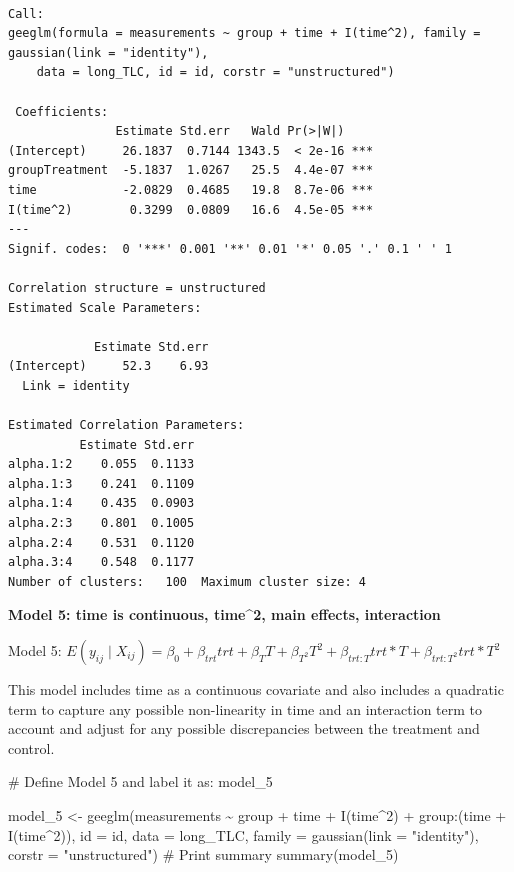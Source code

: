 \documentclass[
  letterpaper,
  DIV=11,
  numbers=noendperiod]{scrreprt}
\newenvironment{Shaded}{\begin{snugshade}}{\end{snugshade}}
\newcommand{\AttributeTok}[1]{\textcolor[rgb]{0.40,0.45,0.13}{#1}}
\newcommand{\CommentTok}[1]{\textcolor[rgb]{0.37,0.37,0.37}{#1}}
\newcommand{\DecValTok}[1]{\textcolor[rgb]{0.68,0.00,0.00}{#1}}
\newcommand{\FunctionTok}[1]{\textcolor[rgb]{0.28,0.35,0.67}{#1}}
\newcommand{\NormalTok}[1]{\textcolor[rgb]{0.00,0.23,0.31}{#1}}
\newcommand{\OtherTok}[1]{\textcolor[rgb]{0.00,0.23,0.31}{#1}}
\newcommand{\SpecialCharTok}[1]{\textcolor[rgb]{0.37,0.37,0.37}{#1}}
\newcommand{\StringTok}[1]{\textcolor[rgb]{0.13,0.47,0.30}{#1}}
\begin{document}
\begin{verbatim}

Call:
geeglm(formula = measurements ~ group + time + I(time^2), family = gaussian(link = "identity"), 
    data = long_TLC, id = id, corstr = "unstructured")

 Coefficients:
               Estimate Std.err   Wald Pr(>|W|)    
(Intercept)     26.1837  0.7144 1343.5  < 2e-16 ***
groupTreatment  -5.1837  1.0267   25.5  4.4e-07 ***
time            -2.0829  0.4685   19.8  8.7e-06 ***
I(time^2)        0.3299  0.0809   16.6  4.5e-05 ***
---
Signif. codes:  0 '***' 0.001 '**' 0.01 '*' 0.05 '.' 0.1 ' ' 1

Correlation structure = unstructured 
Estimated Scale Parameters:

            Estimate Std.err
(Intercept)     52.3    6.93
  Link = identity 

Estimated Correlation Parameters:
          Estimate Std.err
alpha.1:2    0.055  0.1133
alpha.1:3    0.241  0.1109
alpha.1:4    0.435  0.0903
alpha.2:3    0.801  0.1005
alpha.2:4    0.531  0.1120
alpha.3:4    0.548  0.1177
Number of clusters:   100  Maximum cluster size: 4 
\end{verbatim}

\textbf{Model 5: time is continuous, time\^{}2, main effects,
interaction}

Model 5:
\(E(y_{ij} \mid X_{ij}) = \beta_0 + \beta_{trt}trt + \beta_{T}T + \beta_{T^2}T^2 + \beta_{trt:T}trt*T+\beta_{trt:T^2}trt*T^2\)

This model includes time as a continuous covariate and also includes a
quadratic term to capture any possible non-linearity in time and an
interaction term to account and adjust for any possible discrepancies
between the treatment and control.

\begin{Shaded}
\begin{Highlighting}[]
\CommentTok{\# Define Model 5 and label it as: model\_5}

\NormalTok{model\_5 }\OtherTok{\textless{}{-}} \FunctionTok{geeglm}\NormalTok{(measurements }\SpecialCharTok{\textasciitilde{}}\NormalTok{ group }\SpecialCharTok{+}\NormalTok{ time }\SpecialCharTok{+} \FunctionTok{I}\NormalTok{(time}\SpecialCharTok{\^{}}\DecValTok{2}\NormalTok{) }\SpecialCharTok{+}\NormalTok{ group}\SpecialCharTok{:}\NormalTok{(time }\SpecialCharTok{+} \FunctionTok{I}\NormalTok{(time}\SpecialCharTok{\^{}}\DecValTok{2}\NormalTok{)),}
    \AttributeTok{id =}\NormalTok{ id, }\AttributeTok{data =}\NormalTok{ long\_TLC, }\AttributeTok{family =} \FunctionTok{gaussian}\NormalTok{(}\AttributeTok{link =} \StringTok{"identity"}\NormalTok{), }\AttributeTok{corstr =} \StringTok{"unstructured"}\NormalTok{)}
\CommentTok{\# Print summary}
\FunctionTok{summary}\NormalTok{(model\_5)}
\end{Highlighting}
\end{Shaded}
\end{document}
